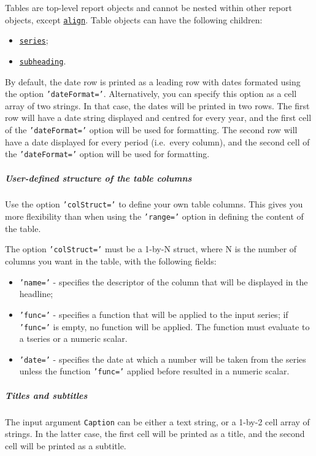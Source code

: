 Tables are top-level report objects and cannot be nested within other
report objects, except \href{report/align}{\texttt{align}}. Table
objects can have the following children:

\begin{itemize}
\itemsep1pt\parskip0pt
\item
  \href{report/series}{\texttt{series}};
\item
  \href{report/subheading}{\texttt{subheading}}.
\end{itemize}

By default, the date row is printed as a leading row with dates formated
using the option \texttt{'dateFormat='}. Alternatively, you can specify
this option as a cell array of two strings. In that case, the dates will
be printed in two rows. The first row will have a date string displayed
and centred for every year, and the first cell of the
\texttt{'dateFormat='} option will be used for formatting. The second
row will have a date displayed for every period (i.e.~every column), and
the second cell of the \texttt{'dateFormat='} option will be used for
formatting.

\subparagraph{User-defined structure of the table
columns}

Use the option \texttt{'colStruct='} to define your own table columns.
This gives you more flexibility than when using the \texttt{'range='}
option in defining the content of the table.

The option \texttt{'colStruct='} must be a 1-by-N struct, where N is the
number of columns you want in the table, with the following fields:

\begin{itemize}
\item
  \texttt{'name='} - specifies the descriptor of the column that will be
  displayed in the headline;
\item
  \texttt{'func='} - specifies a function that will be applied to the
  input series; if \texttt{'func='} is empty, no function will be
  applied. The function must evaluate to a tseries or a numeric scalar.
\item
  \texttt{'date='} - specifies the date at which a number will be taken
  from the series unless the function \texttt{'func='} applied before
  resulted in a numeric scalar.
\end{itemize}

\subparagraph{Titles and subtitles}

The input argument \texttt{Caption} can be either a text string, or a
1-by-2 cell array of strings. In the latter case, the first cell will be
printed as a title, and the second cell will be printed as a subtitle.

